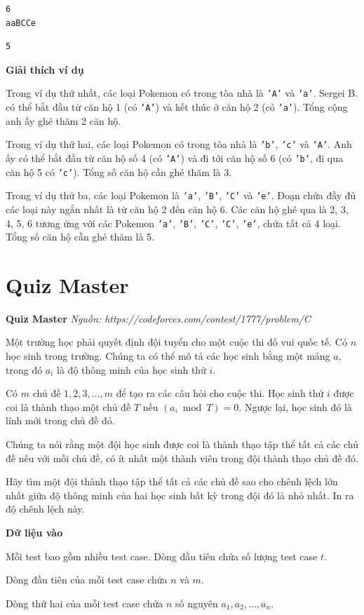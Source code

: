 \documentclass[12pt,a4paper]{article}
\newcommand{\problem}[2]{%
  \begin{mdframed}[
    linecolor=framecolor,
    linewidth=1.5pt,
    backgroundcolor=white,
    topline=true, bottomline=true,
    leftline=true, rightline=true,
    innerleftmargin=10pt, innerrightmargin=10pt,
    innertopmargin=6pt, innerbottommargin=6pt,
  ]
  \textbf{\large #1} \hfill \textit{Nguồn: #2}
  \end{mdframed}
  \vspace{4pt}%
}
\newcommand{\inputformat}{%
  \vspace{6pt}\textbf{\textcolor{sectioncolor}{Dữ liệu vào}}\par\vspace{2pt}%
}
\newcommand{\explanation}{%
  \vspace{6pt}\textbf{\textcolor{sectioncolor}{Giải thích ví dụ}}\par\vspace{2pt}%
}
\begin{document}
\begin{lstlisting}
6
aaBCCe
\end{lstlisting}
\begin{lstlisting}
5
\end{lstlisting}

\explanation
Trong ví dụ thứ nhất, các loại Pokemon có trong tòa nhà là \texttt{'A'} và \texttt{'a'}. Sergei B. có thể bắt đầu từ căn hộ 1 (có \texttt{'A'}) và kết thúc ở căn hộ 2 (có \texttt{'a'}). Tổng cộng anh ấy ghé thăm 2 căn hộ.

Trong ví dụ thứ hai, các loại Pokemon có trong tòa nhà là \texttt{'b'}, \texttt{'c'} và \texttt{'A'}. Anh ấy có thể bắt đầu từ căn hộ số 4 (có \texttt{'A'}) và đi tới căn hộ số 6 (có \texttt{'b'}, đi qua căn hộ 5 có \texttt{'c'}). Tổng số căn hộ cần ghé thăm là 3.

Trong ví dụ thứ ba, các loại Pokemon là \texttt{'a'}, \texttt{'B'}, \texttt{'C'} và \texttt{'e'}. Đoạn chứa đầy đủ các loại này ngắn nhất là từ căn hộ 2 đến căn hộ 6. Các căn hộ ghé qua là 2, 3, 4, 5, 6 tương ứng với các Pokemon \texttt{'a'}, \texttt{'B'}, \texttt{'C'}, \texttt{'C'}, \texttt{'e'}, chứa tất cả 4 loại. Tổng số căn hộ cần ghé thăm là 5.


\section{Quiz Master}
\problem{Quiz Master}{https://codeforces.com/contest/1777/problem/C}

Một trường học phải quyết định đội tuyển cho một cuộc thi đố vui quốc tế. Có $n$ học sinh trong trường. Chúng ta có thể mô tả các học sinh bằng một mảng $a$, trong đó $a_i$ là độ thông minh của học sinh thứ $i$.

Có $m$ chủ đề $1, 2, 3, \ldots, m$ để tạo ra các câu hỏi cho cuộc thi. Học sinh thứ $i$ được coi là thành thạo một chủ đề $T$ nếu $(a_i \bmod T) = 0$. Ngược lại, học sinh đó là lính mới trong chủ đề đó.

Chúng ta nói rằng một đội học sinh được coi là thành thạo tập thể tất cả các chủ đề nếu với mỗi chủ đề, có ít nhất một thành viên trong đội thành thạo chủ đề đó.

Hãy tìm một đội thành thạo tập thể tất cả các chủ đề sao cho chênh lệch lớn nhất giữa độ thông minh của hai học sinh bất kỳ trong đội đó là nhỏ nhất. In ra độ chênh lệch này.

\inputformat
\begin{inputbox}
Mỗi test bao gồm nhiều test case. Dòng đầu tiên chứa số lượng test case $t$.

Dòng đầu tiên của mỗi test case chứa $n$ và $m$.

Dòng thứ hai của mỗi test case chứa $n$ số nguyên $a_1, a_2, \ldots, a_n$.
\end{inputbox}
\end{document}
